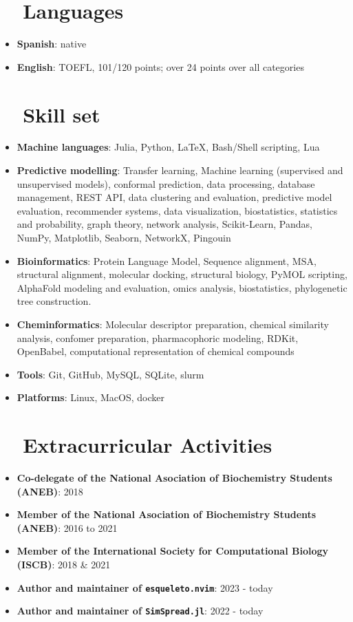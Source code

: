 \documentclass[letter,20pt]{article}
\newcommand{\resumeItem}[2]{
  \item\small{
    \textbf{#1}{: #2 \vspace{-2pt}}
  }
}
\newcommand{\resumeSubItem}[2]{\resumeItem{#1}{#2}\vspace{-3pt}}
\newcommand{\resumeSubHeadingListStart}{\begin{itemize}[leftmargin=*]}
\newcommand{\resumeSubHeadingListEnd}{\end{itemize}}
\begin{document}
\section{~~Languages}
\resumeSubHeadingListStart
\resumeSubItem{Spanish}{native}
\resumeSubItem{English}{TOEFL, 101/120 points; over 24 points over all categories}
\resumeSubHeadingListEnd
\vspace{5pt}
\section{~~Skill set}
\resumeSubHeadingListStart
\resumeSubItem{Machine languages}{Julia, Python, LaTeX, Bash/Shell scripting, Lua}
\resumeSubItem{Predictive modelling}{Transfer learning, Machine learning (supervised and unsupervised models), conformal prediction, data processing, database management, REST API, data clustering and evaluation, predictive model evaluation, recommender systems, data visualization, biostatistics, statistics and probability, graph theory, network analysis, Scikit-Learn, Pandas, NumPy, Matplotlib, Seaborn, NetworkX, Pingouin}
\resumeSubItem{Bioinformatics}{Protein Language Model, Sequence alignment, MSA, structural alignment, molecular docking, structural biology, PyMOL scripting, AlphaFold modeling and evaluation, omics analysis, biostatistics, phylogenetic tree construction.}
\resumeSubItem{Cheminformatics}{Molecular descriptor preparation, chemical similarity analysis, confomer preparation, pharmacophoric modeling, RDKit, OpenBabel, computational representation of chemical compounds}
\resumeSubItem{Tools}{Git, GitHub, MySQL, SQLite, slurm}
\resumeSubItem{Platforms}{Linux, MacOS, docker}
\resumeSubHeadingListEnd
\vspace{5pt}
\section{~~Extracurricular Activities}
\resumeSubHeadingListStart
\resumeSubItem{Co-delegate of the National Asociation of Biochemistry Students (ANEB)}{2018}
\resumeSubItem{Member of the National Asociation of Biochemistry Students (ANEB)}{2016 to 2021}
\resumeSubItem{Member of the International Society for Computational Biology (ISCB)}{2018 \& 2021}
\resumeSubItem{Author and maintainer of \texttt{esqueleto.nvim}}{2023 - today}
\resumeSubItem{Author and maintainer of \texttt{SimSpread.jl}}{2022 - today}
\resumeSubHeadingListEnd
\vspace{5pt}
\end{document}
